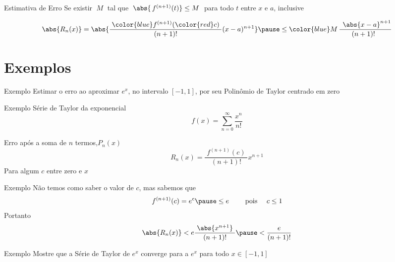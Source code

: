 \documentclass[fleqn,utf8,aspectratio=169,12pt]{beamer}
\begin{document}
\begin{frame}{Estimativa de Erro}
Se existir \(\;M\;\) tal que  \emph{\(\;\abs{\,f^{(n+1)}(t)} \leq M \;\)}
para todo \(t\) entre \(x\) e \(a\), inclusive

\pause
\vspace{\baselineskip}
\[
  \abs{R_n(x)}
  = \abs{\frac{\;{\color{blue}f^{(n+1)}({\color{red}c})}\;}{(n+1)!}(x-a)^{n+1}} \pause
  \leq {\color{blue} M}\, \frac{\;\,\abs{x-a}^{n+1}}{(n+1)!\;\;}
\]
\end{frame}

\section{Exemplos}

\addtocounter{exemplo}{1}
\begin{frame}{Exemplo \theexemplo}
  Estimar o erro ao aproximar \(e^x\), no intervalo \([-1, 1]\),
  por seu Polinômio de Taylor centrado em zero
\end{frame}

\begin{frame}{Exemplo \theexemplo}
  Série de Taylor da exponencial
  \[
    f(x) = \sum_{n=0}^\infty \frac{x^n}{n!}
  \]

  \pause
  Erro após a soma de $n$ termos,\(P_n(x)\)
  \[
    R_n(x)=\frac{\;f^{(n+1)}(c)\;}{(n+1)!}x^{n+1}
  \]
  Para algum $c$ entre zero e $x$
\end{frame}

\begin{frame}{Exemplo \theexemplo}
  Não temos como saber o valor de $c$\pause, mas sabemos que
  \[
    f^{(n+1)}(c) = e^c \pause \leq e
    \qquad\text{ pois } \quad c \leq 1
  \]
  \pause
  Portanto
  \[
    \abs{R_n(x)} < e\frac{\;\abs{x^{n+1}}\;}{(n+1)!} \pause
                 < \frac{\;e\;}{(n+1)!}
  \]
\end{frame}

\addtocounter{exemplo}{1}
\begin{frame}{Exemplo \theexemplo}
  Mostre que a Série de Taylor de \(e^x\) converge para a \(e^x\) para todo
  \(x\in[-1, 1]\)
\end{frame}
\end{document}
